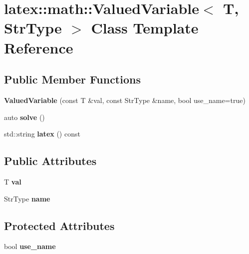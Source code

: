 \hypertarget{classlatex_1_1math_1_1ValuedVariable}{\section{latex\-:\-:math\-:\-:Valued\-Variable$<$ T, Str\-Type $>$ Class Template Reference}
\label{classlatex_1_1math_1_1ValuedVariable}
}
\subsection*{Public Member Functions}
\begin{DoxyCompactItemize}
\item 
\hypertarget{classlatex_1_1math_1_1ValuedVariable_a9a6f810a0147890ac6788d5862d5b567}{{\bfseries Valued\-Variable} (const T \&val, const Str\-Type \&name, bool use\-\_\-name=true)}\label{classlatex_1_1math_1_1ValuedVariable_a9a6f810a0147890ac6788d5862d5b567}

\item 
\hypertarget{classlatex_1_1math_1_1ValuedVariable_ad643db16a3e736a6ddcdbdbaae153d13}{auto {\bfseries solve} ()}\label{classlatex_1_1math_1_1ValuedVariable_ad643db16a3e736a6ddcdbdbaae153d13}

\item 
\hypertarget{classlatex_1_1math_1_1ValuedVariable_a52382b093d59ab8366400366569cee75}{std\-::string {\bfseries latex} () const }\label{classlatex_1_1math_1_1ValuedVariable_a52382b093d59ab8366400366569cee75}

\end{DoxyCompactItemize}
\subsection*{Public Attributes}
\begin{DoxyCompactItemize}
\item 
\hypertarget{classlatex_1_1math_1_1ValuedVariable_aad84e39391316c36825af042992ac225}{T {\bfseries val}}\label{classlatex_1_1math_1_1ValuedVariable_aad84e39391316c36825af042992ac225}

\item 
\hypertarget{classlatex_1_1math_1_1ValuedVariable_a3a264740a41049cc02f6a4f50d1279af}{Str\-Type {\bfseries name}}\label{classlatex_1_1math_1_1ValuedVariable_a3a264740a41049cc02f6a4f50d1279af}

\end{DoxyCompactItemize}
\subsection*{Protected Attributes}
\begin{DoxyCompactItemize}
\item 
\hypertarget{classlatex_1_1math_1_1ValuedVariable_a96abea7cceefbe528070cd2b9ee9706a}{bool {\bfseries use\-\_\-name}}\label{classlatex_1_1math_1_1ValuedVariable_a96abea7cceefbe528070cd2b9ee9706a}

\end{DoxyCompactItemize}
